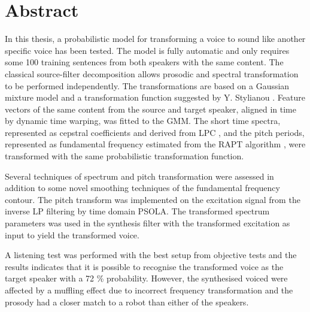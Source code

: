 % 
\chapter*{Abstract} %
\label{cha:abstract}
	In this thesis, a probabilistic model for transforming a voice to sound like another specific voice has been tested. The model is fully automatic and only requires some 100 training sentences from both speakers with the same content. The classical source-filter decomposition allows prosodic and spectral transformation to be performed independently. The transformations are based on a Gaussian mixture model and a transformation function suggested by Y. Stylianou \cite{stylianou98}. Feature vectors of the same content from the source and target speaker, aligned in time by dynamic time warping, was fitted to the GMM. The short time spectra, represented as cepstral coefficients and derived from LPC \cite{atal68}, and the pitch periods, represented as fundamental frequency estimated from the RAPT algorithm \cite{talkin95}, were transformed with the same probabilistic transformation function.

Several techniques of spectrum and pitch transformation were assessed in addition to some novel smoothing techniques of the fundamental frequency contour. The pitch transform was implemented on the excitation signal from the inverse LP filtering by time domain PSOLA. The transformed spectrum parameters was used in the synthesis filter with the transformed excitation as input to yield the transformed voice.

	A listening test was performed with the best setup from objective tests and the results indicates that it is possible to recognise the transformed voice as the target speaker with a 72 \% probability. However, the synthesised voiced were affected by a muffling effect due to incorrect frequency transformation and the prosody had a closer match to a robot than either of the speakers.


